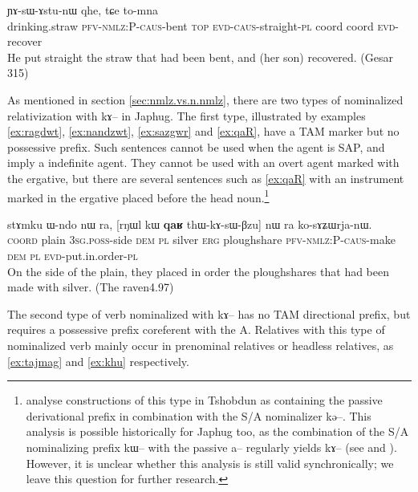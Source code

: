 \documentclass[oldfontcommands,oneside,a4paper,11pt]{article}
\newcommand{\ipa}[1]{{\phon #1}} %
\begin{document}
     \begin{exe}
   \ex \label{ex:sazgwr}
\gll [\textbf{\ipa{chɤmdɤru}}  	\ipa{tɤ-kɤ-sɯ-ɤzgɯr}]  	\ipa{nɯ}  	\ipa{ɲɤ-sɯ-ɤstu-nɯ}  	\ipa{qhe,}  	\ipa{tɕe}  	\ipa{to-mna}  \\
drinking.straw \textsc{pfv-nmlz:P-caus}-bent \textsc{top} \textsc{evd-caus}-straight-\textsc{pl} coord coord \textsc{evd}-recover \\
\glt He put straight the straw that  had been bent, and (her son) recovered. (Gesar 315)
   \end{exe}  
   

As mentioned in section \ref{sec:nmlz.vs.n.nmlz}, there are two types of nominalized relativization with \ipa{kɤ}-- in Japhug. The first type, illustrated by examples  \ref{ex:ragdwt}, \ref{ex:nandzwt}, \ref{ex:sazgwr} and \ref{ex:qaR}, have a TAM marker but no possessive prefix. Such sentences cannot be used when the agent is  SAP, and imply a indefinite agent. They cannot be used with an overt agent marked with the ergative, but there are several sentences such as \ref{ex:qaR} with an instrument marked in the ergative placed before the head noun.\footnote{ \citet{jacksonlin07} analyse constructions of this type in Tshobdun as   containing the passive derivational prefix in combination with the S/A nominalizer \ipa{kə}--. This analysis is possible historically for Japhug too, as the combination of the S/A nominalizing prefix \ipa{kɯ}-- with the passive \ipa{a}-- regularly yields \ipa{kɤ}-- (see \citealt{jacques07passif} and \citealt{jacques12demotion}). However, it is unclear whether this analysis is still valid synchronically; we leave this question for further research.}

\begin{exe}
   \ex \label{ex:qaR}
\gll  \ipa{tɕe}  	\ipa{stɤmku}  	\ipa{ɯ-ndo}  	\ipa{nɯ} \ipa{ra,}  	[\ipa{rŋɯl}  	\ipa{kɯ}  	\textbf{\ipa{qaʁ}}  	\ipa{thɯ-kɤ-sɯ-βzu}] 	\ipa{nɯ} \ipa{ra}  	\ipa{ko-sɤʑɯrja-nɯ.}   \\
\textsc{coord} plain \textsc{3sg.poss}-side \textsc{dem} \textsc{pl} 
silver \textsc{erg} ploughshare \textsc{pfv-nmlz:P-caus}-make  \textsc{dem} \textsc{pl} \textsc{evd}-put.in.order-\textsc{pl}\\
  \glt On the side of the plain, they placed in order the ploughshares that had been made with silver. (The raven4.97)
   \end{exe}  


The second type of verb nominalized with \ipa{kɤ}-- has no TAM directional prefix, but requires a possessive prefix coreferent with the A. Relatives with this type of nominalized verb mainly occur in prenominal relatives or headless relatives, as \ref{ex:tajmag} and \ref{ex:khu} respectively.
\end{document}
